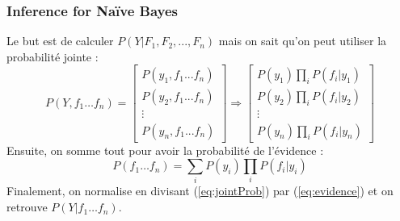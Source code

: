 \subsubsection{Inference for Naïve Bayes}
Le but est de calculer $P(Y|F_1, F_2, ..., F_n)$ mais on sait qu'on peut utiliser la probabilité jointe :
\begin{equation}
    P(Y,f_1\dots f_n) =
    \begin{bmatrix}
        P(y_1,f_1...f_n)\\
        P(y_2,f_1...f_n)\\
        \vdots\\
        P(y_n,f_1...f_n)
    \end{bmatrix}
    \Rightarrow
    \begin{bmatrix}
        P(y_1)\prod_{i} P(f_i|y_1)\\
        P(y_2)\prod_{i} P(f_i|y_2)\\
        \vdots\\
        P(y_n)\prod_{i} P(f_i|y_n)
    \end{bmatrix}   
\label{eq:jointProb}
\end{equation}
Ensuite, on somme tout pour avoir la probabilité de l'évidence :
\begin{equation}
    P(f_1\dots f_n) = \sum_{i} P(y_i)\prod_{i} P(f_i|y_i)
\label{eq:evidence}
\end{equation}
Finalement, on normalise en divisant (\ref{eq:jointProb}) par (\ref{eq:evidence}) et on retrouve $P(Y|f_1\dots f_n)$.
